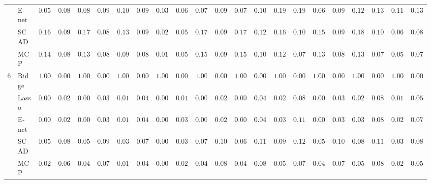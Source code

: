 \begin{tabular}{ll|ll|llllll|llllll|llllll}
 & E-net  & $0.0517$ & $0.0810$ & $0.0883$ & $0.0931$ & $0.1000$ & $0.0917$ & $0.0300$ & $0.0686$ & $0.0700$ & $0.0923$ & $0.0717$ & $0.1012$ & $0.1967$ & $0.1930$ & $0.0667$ & $0.0917$ & $0.1283$ & $0.1316$ & $0.1100$ & $0.1324$ \\
 & SCAD  & $0.1600$ & $0.0915$ & $0.1717$ & $0.0869$ & $0.1300$ & $0.0905$ & $0.0217$ & $0.0563$ & $0.1700$ & $0.0947$ & $0.1733$ & $0.1206$ & $0.1650$ & $0.1046$ & $0.1550$ & $0.0955$ & $0.1833$ & $0.1046$ & $0.0633$ & $0.0879$ \\
 & MCP  & $0.1417$ & $0.0833$ & $0.1383$ & $0.0856$ & $0.0917$ & $0.0866$ & $0.0183$ & $0.0524$ & $0.1500$ & $0.0902$ & $0.1517$ & $0.1008$ & $0.1250$ & $0.0763$ & $0.1333$ & $0.0821$ & $0.1367$ & $0.0799$ & $0.0517$ & $0.0775$ \\\hline
6 & Ridge  & $1.0000$ & $0.0000$ & $1.0000$ & $0.0000$ & $1.0000$ & $0.0000$ & $1.0000$ & $0.0000$ & $1.0000$ & $0.0000$ & $1.0000$ & $0.0000$ & $1.0000$ & $0.0000$ & $1.0000$ & $0.0000$ & $1.0000$ & $0.0000$ & $1.0000$ & $0.0000$ \\
 & Lasso  & $0.0033$ & $0.0235$ & $0.0067$ & $0.0328$ & $0.0100$ & $0.0463$ & $0.0017$ & $0.0167$ & $0.0050$ & $0.0286$ & $0.0083$ & $0.0435$ & $0.0267$ & $0.0877$ & $0.0083$ & $0.0365$ & $0.0283$ & $0.0822$ & $0.0133$ & $0.0512$ \\
 & E-net  & $0.0033$ & $0.0235$ & $0.0067$ & $0.0328$ & $0.0117$ & $0.0489$ & $0.0067$ & $0.0328$ & $0.0050$ & $0.0286$ & $0.0067$ & $0.0405$ & $0.0333$ & $0.1111$ & $0.0083$ & $0.0365$ & $0.0300$ & $0.0834$ & $0.0200$ & $0.0722$ \\
 & SCAD  & $0.0500$ & $0.0838$ & $0.0567$ & $0.0924$ & $0.0333$ & $0.0786$ & $0.0067$ & $0.0328$ & $0.0700$ & $0.1037$ & $0.0650$ & $0.1108$ & $0.0967$ & $0.1235$ & $0.0583$ & $0.1015$ & $0.0833$ & $0.1148$ & $0.0333$ & $0.0821$ \\
 & MCP  & $0.0267$ & $0.0614$ & $0.0417$ & $0.0763$ & $0.0150$ & $0.0479$ & $0.0033$ & $0.0235$ & $0.0400$ & $0.0825$ & $0.0483$ & $0.0896$ & $0.0567$ & $0.0793$ & $0.0400$ & $0.0754$ & $0.0533$ & $0.0883$ & $0.0200$ & $0.0544$ \\
\hline 
\end{tabular}

